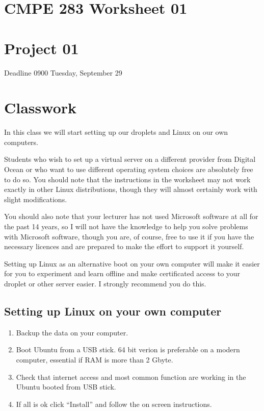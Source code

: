 \documentclass[12pt,a4paper]{article}
\begin{document}

\section*{CMPE 283 Worksheet 01}
\section*{Project 01} 
Deadline 0900 Tuesday, September 29

\section*{Classwork}
In this class we will start setting up our droplets and Linux on our own 
computers.

Students who wish to set up a virtual server on a different provider from 
Digital Ocean or who want to use different operating system choices are 
absolutely free to do so. You should note that the instructions in the worksheet may not work exactly in other Linux distributions, though they will almost certainly work with slight modifications.

You should also note that your lecturer has not used Microsoft software at all for the past 14 years, so I will not have the knowledge to help you solve problems with Microsoft software, though you are, of course, free to use it if you have the necessary licences and are prepared to make the effort to support it yourself. 

Setting up Linux as an alternative boot on your own computer will make it easier for you to experiment and learn offline and make certificated access to your droplet or other server easier. I strongly recommend you do this. 

\subsection*{Setting up Linux on your own computer}
\begin{enumerate}
 \item Backup the data on your computer.
 \item Boot Ubuntu from a USB stick. 64 bit verion is preferable on a modern computer,
  essential if RAM is more than 2 Gbyte.
 \item Check that internet access and most common function are working in the Ubuntu booted from USB stick.
 \item If all is ok click ``Install'' and follow the on screen instructions.
\end{enumerate}
\end{document}
